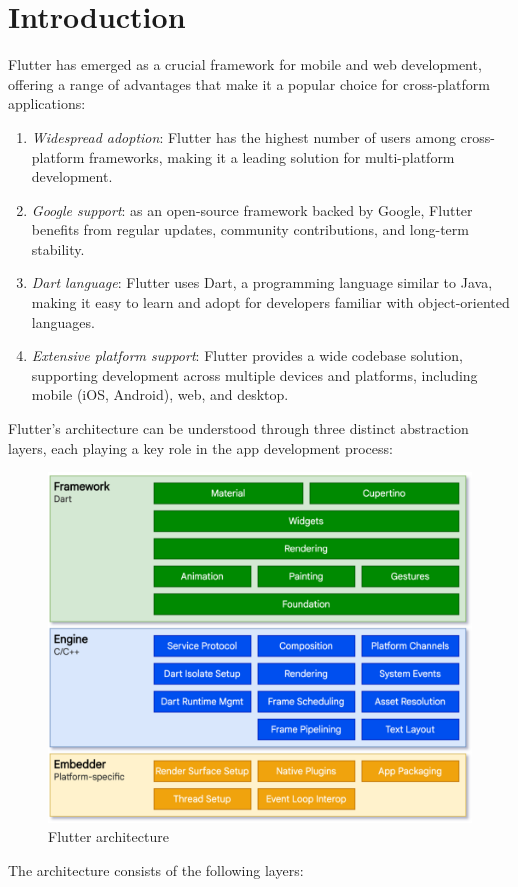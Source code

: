 \section{Introduction}

Flutter has emerged as a crucial framework for mobile and web development, offering a range of advantages that make it a popular choice for cross-platform applications:
\begin{enumerate} 
    \item \textit{Widespread adoption}: Flutter has the highest number of users among cross-platform frameworks, making it a leading solution for multi-platform development. 
    \item \textit{Google support}: as an open-source framework backed by Google, Flutter benefits from regular updates, community contributions, and long-term stability. 
    \item \textit{Dart language}: Flutter uses Dart, a programming language similar to Java, making it easy to learn and adopt for developers familiar with object-oriented languages. 
    \item \textit{Extensive platform support}: Flutter provides a wide codebase solution, supporting development across multiple devices and platforms, including mobile (iOS, Android), web, and desktop. 
\end{enumerate}
Flutter's architecture can be understood through three distinct abstraction layers, each playing a key role in the app development process:
\begin{figure}[H]
    \centering
    \includegraphics[width=0.75\linewidth]{images/flutter.png}
    \caption{Flutter architecture}
\end{figure}
The architecture consists of the following layers:
